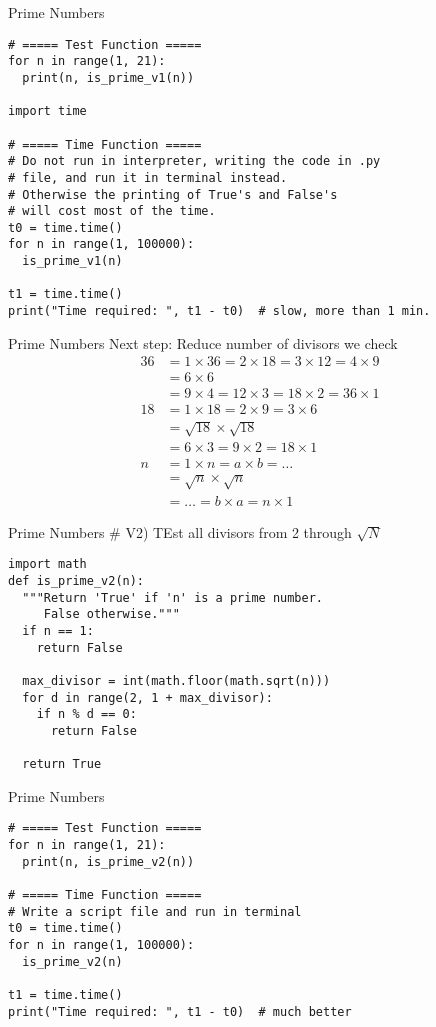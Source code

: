 \documentclass{beamer}
\begin{document}
\begin{frame}[fragile]{Prime Numbers}
\begin{verbatim}
# ===== Test Function =====
for n in range(1, 21):
  print(n, is_prime_v1(n))

import time

# ===== Time Function =====
# Do not run in interpreter, writing the code in .py
# file, and run it in terminal instead.
# Otherwise the printing of True's and False's
# will cost most of the time.
t0 = time.time()
for n in range(1, 100000):
  is_prime_v1(n)

t1 = time.time()
print("Time required: ", t1 - t0)  # slow, more than 1 min.
\end{verbatim}
\end{frame}

\begin{frame}[fragile]{Prime Numbers} \vspace{.5em}
Next step: Reduce number of divisors we check
\begin{align*}
36&=1\times36=2\times18=3\times12=4\times9\\
  &=6\times6\\
  &=9\times4=12\times3=18\times2=36\times1\\
18&=1\times18=2\times9=3\times6\\
  &=\sqrt{18}\times\sqrt{18}\\
  &=6\times3=9\times2=18\times1\\
n &=1\times n=a\times b=\dots\\
  &=\sqrt{n}\times\sqrt{n}\\
  &=\dots=b\times a=n\times1
\end{align*}
\end{frame}

\begin{frame}[fragile]{Prime Numbers} \vspace{1em}
\# V2) TEst all divisors from 2 through $\sqrt{N}$
\begin{verbatim}
import math
def is_prime_v2(n):
  """Return 'True' if 'n' is a prime number.
     False otherwise."""
  if n == 1:
    return False

  max_divisor = int(math.floor(math.sqrt(n)))
  for d in range(2, 1 + max_divisor):
    if n % d == 0:
      return False

  return True
\end{verbatim}
\end{frame}

\begin{frame}[fragile]{Prime Numbers}
\begin{verbatim}
# ===== Test Function =====
for n in range(1, 21):
  print(n, is_prime_v2(n))

# ===== Time Function =====
# Write a script file and run in terminal
t0 = time.time()
for n in range(1, 100000):
  is_prime_v2(n)

t1 = time.time()
print("Time required: ", t1 - t0)  # much better
\end{verbatim}
\end{frame}
\end{document}
